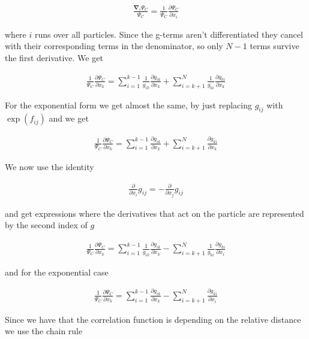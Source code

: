 \documentclass[x11names]{article}
\begin{document}
			\begin{align}
				\frac{\mathbf{\nabla}_{i}\Psi_{C}}{\Psi_{C}}=\frac{1}{\Psi_{C}}\frac{\partial\Psi_{C}}{\partial x_{i}}
			\end{align}

			where $i$ runs over all particles. Since the g-terms aren't differentiated
			they cancel with their corresponding terms in the denominator, so
			only $N-1$ terms survive the first derivative. We get

			\begin{align}
				\frac{1}{\Psi_{C}}\frac{\partial\Psi_{C}}{\partial x_{k}}=\sum_{i=1}^{k-1}\frac{1}{g_{ik}}\frac{\partial g_{ik}}{\partial x_{k}}+\sum_{i=k+1}^{N}\frac{1}{g_{ki}}\frac{\partial g_{ki}}{\partial x_{k}}
			\end{align}

			For the exponential form we get almost the same, by just replacing
			$g_{ij}$ with $\exp\left(f_{ij}\right)$ and we get

			\begin{align}
				\frac{1}{\Psi_{C}}\frac{\partial\Psi_{C}}{\partial x_{k}}=\sum_{i=1}^{k-1}\frac{\partial g_{ik}}{\partial x_{k}}+\sum_{i=k+1}^{N}\frac{\partial g_{ki}}{\partial x_{k}}
			\end{align}

			We now use the identity

			\begin{align}
				\frac{\partial}{\partial x_{i}}g_{ij}=-\frac{\partial}{\partial x_{j}}g_{ij}
			\end{align}

			and get expressions where the derivatives that act on the particle
			are represented by the second index of $g$

			\begin{align}
				\frac{1}{\Psi_{C}}\frac{\partial\Psi_{C}}{\partial x_{k}}=\sum_{i=1}^{k-1}\frac{1}{g_{ik}}\frac{\partial g_{ik}}{\partial x_{k}}-\sum_{i=k+1}^{N}\frac{1}{g_{ki}}\frac{\partial g_{ki}}{\partial x_{i}}
			\end{align}

			and for the exponential case

			\begin{align}
				\frac{1}{\Psi_{C}}\frac{\partial\Psi_{C}}{\partial x_{k}}=\sum_{i=1}^{k-1}\frac{\partial g_{ik}}{\partial x_{k}}-\sum_{i=k+1}^{N}\frac{\partial g_{ki}}{\partial x_{i}}
			\end{align}


			Since we have that the correlation function is depending on the relative
			distance we use the chain rule
\end{document}
